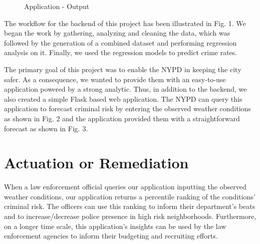 \documentclass[conference]{IEEEtran}
\begin{document}
\begin{figure}[htbp]
\centerline{}
\caption{Application - Output}
\label{design}
\end{figure}

The workflow for the backend of this project has been illustrated in Fig. 1.
We began the work by gathering, analyzing and cleaning the data, which was followed by the generation of a combined dataset and performing regression analysis on it.
Finally, we used the regression models to predict crime rates.

The primary goal of this project was to enable the NYPD in keeping the city safer.
As a consequence, we wanted to provide them with an easy-to-use application powered by a strong analytic.
Thus, in addition to the backend, we also created a simple Flask based web application.
The NYPD can query this application to forecast criminal risk by entering the observed weather conditions as shown in Fig. 2 and the application provided them with a straightforward forecast as shown in Fig. 3.

\section{Actuation or Remediation}
When a law enforcement official queries our application inputting the observed weather conditions, our application returns a percentile ranking of the conditions' criminal risk.
The officers can use this ranking to inform their department's beats and to increase/decrease police presence in high risk neighborhoods.
Furthermore, on a longer time scale, this application's insights can be used by the law enforcement agencies to inform their budgeting and recruiting efforts.
\end{document}
